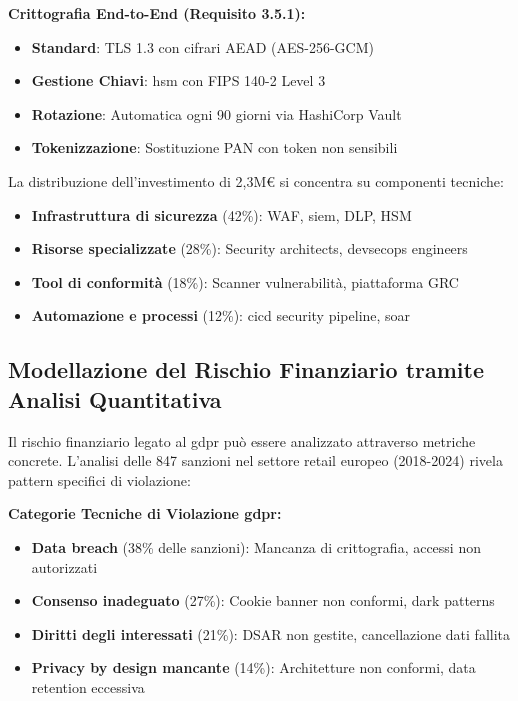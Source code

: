 \textbf{Crittografia End-to-End (Requisito 3.5.1):}
\begin{itemize}
    \item \textbf{Standard}: TLS 1.3 con cifrari AEAD (AES-256-GCM)
    \item \textbf{Gestione Chiavi}: \gls{hsm} con FIPS 140-2 Level 3
    \item \textbf{Rotazione}: Automatica ogni 90 giorni via HashiCorp Vault
    \item \textbf{Tokenizzazione}: Sostituzione PAN con token non sensibili
\end{itemize}

La distribuzione dell'investimento di 2,3M€ si concentra su componenti tecniche:
\begin{itemize}
    \item \textbf{Infrastruttura di sicurezza} (42\%): WAF, \gls{siem}, DLP, HSM
    \item \textbf{Risorse specializzate} (28\%): Security architects, \gls{devsecops} engineers
    \item \textbf{Tool di conformità} (18\%): Scanner vulnerabilità, piattaforma GRC
    \item \textbf{Automazione e processi} (12\%): \gls{cicd} security pipeline, \gls{soar}
\end{itemize}

\subsection{\texorpdfstring{Modellazione del Rischio Finanziario tramite Analisi Quantitativa}{4.2.2 - Modellazione del Rischio Finanziario tramite Analisi Quantitativa}}

Il rischio finanziario legato al \gls{gdpr} può essere analizzato attraverso metriche concrete\autocite{mcneil2015}. L'analisi delle 847 sanzioni nel settore retail europeo (2018-2024)\autocite{EDPB2024} rivela pattern specifici di violazione:

\textbf{Categorie Tecniche di Violazione \gls{gdpr}:}
\begin{itemize}
    \item \textbf{Data breach} (38\% delle sanzioni): Mancanza di crittografia, accessi non autorizzati
    \item \textbf{Consenso inadeguato} (27\%): Cookie banner non conformi, dark patterns
    \item \textbf{Diritti degli interessati} (21\%): DSAR non gestite, cancellazione dati fallita
    \item \textbf{Privacy by design mancante} (14\%): Architetture non conformi, data retention eccessiva
\end{itemize}

